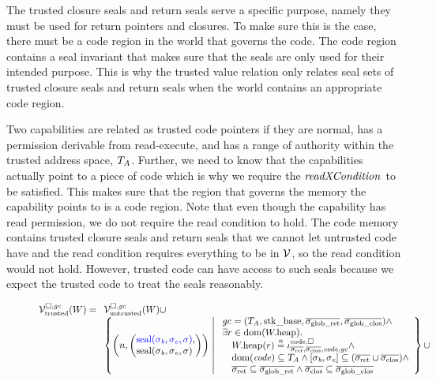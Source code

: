 \begin{jversion}
The trusted closure seals and return seals serve a specific purpose, namely they must be used for return pointers and closures.
To make sure this is the case, there must be a code region in the world that governs the code.
The code region contains a seal invariant that makes sure that the seals are only used for their intended purpose.
This is why the trusted value relation only relates seal sets of trusted closure seals and return seals when the world contains an appropriate code region.

Two capabilities are related as trusted code pointers if they are normal, has a permission derivable from read-execute, and has a range of authority within the trusted address space, $T_{A}$.
Further, we need to know that the capabilities actually point to a piece of code which is why we require the $\xReadCond[]{}$ to be satisfied.
This makes sure that the region that governs the memory the capability points to is a code region.
Note that even though the capability has read permission, we do not require the read condition to hold.
The code memory contains trusted closure seals and return seals that we cannot let untrusted code have and the read condition requires everything to be in $\mathcal{V}$, so the read condition would not hold.
However, trusted code can have access to such seals because we expect the trusted code to treat the seals reasonably.
\begin{figure}
  \centering
  \[
  \lrvtrusted[\square,\gc](W) =
  \begin{array}[t]{l}
    \lrv(W)\cup \\
%
    \left\{ \npair{\left(\arraycolsep=0pt\array{l} \src{\seal{\sigma_\baddr,\sigma_\eaddr,\sigma}},\\ \seal{\sigma_\baddr,\sigma_\eaddr,\sigma} \endarray \right)} 
    \; \middle| \;
    \begin{array}{l}
      \gc = (\ta,\stkb,\gsigrets,\gsigcloss)  \wedge \\
      \exists r \in \dom(\pwheap) \ldotp \\
      \quad \pwheap(r) \nequal \codereg{\sigrets,\sigcloss,\code,\gc} \wedge\\
      \quad \dom(\code) \subseteq \ta \wedge [\sigma_\baddr,\sigma_\eaddr] \subseteq (\sigrets\cup\sigcloss) \wedge\\
      \quad \sigrets \subseteq \gsigrets \wedge \sigcloss \subseteq \gsigcloss
    \end{array}
    \right\} \cup \\

\end{array}\]
\end{figure}
\end{jversion}
